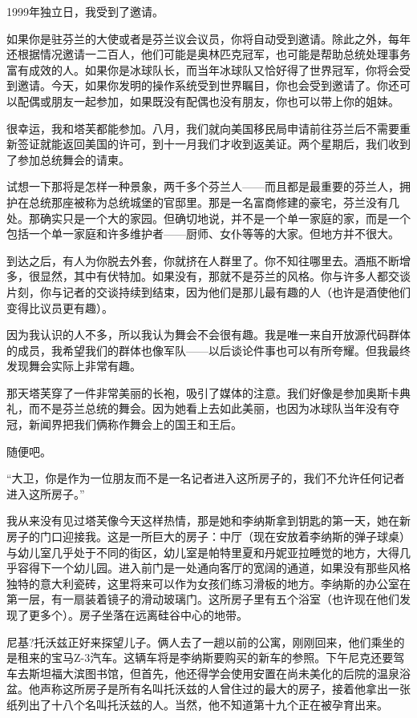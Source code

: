 1999年独立日，我受到了邀请。

如果你是驻芬兰的大使或者是芬兰议会议员，你将自动受到邀请。除此之外，每年还根据情况邀请一二百人，他们可能是奥林匹克冠军，也可能是帮助总统处理事务富有成效的人。如果你是冰球队长，而当年冰球队又恰好得了世界冠军，你将会受到邀请。今天，如果你发明的操作系统受到世界瞩目，你也会受到邀请了。你还可以配偶或朋友一起参加，如果既没有配偶也没有朋友，你也可以带上你的姐妹。

很幸运，我和塔芙都能参加。八月，我们就向美国移民局申请前往芬兰后不需要重新签证就能返回美国的许可，到十一月我们才收到返美证。两个星期后，我们收到了参加总统舞会的请柬。

试想一下那将是怎样一种景象，两千多个芬兰人——而且都是最重要的芬兰人，拥护在总统那座被称为总统城堡的官邸里。那是一名富商修建的豪宅，芬兰没有几处。那确实只是一个大的家园。但确切地说，并不是一个单一家庭的家，而是一个包括一个单一家庭和许多维护者——厨师、女仆等等的大家。但地方并不很大。

到达之后，有人为你脱去外套，你就挤在人群里了。你不知往哪里去。酒瓶不断增多，很显然，其中有伏特加。如果没有，那就不是芬兰的风格。你与许多人都交谈片刻，你与记者的交谈持续到结束，因为他们是那儿最有趣的人（也许是酒使他们变得比议员更有趣）。

因为我认识的人不多，所以我认为舞会不会很有趣。我是唯一来自开放源代码群体的成员，我希望我们的群体也像军队——以后谈论件事也可以有所夸耀。但我最终发现舞会实际上非常有趣。

那天塔芙穿了一件非常美丽的长袍，吸引了媒体的注意。我们好像是参加奥斯卡典礼，而不是芬兰总统的舞会。因为她看上去如此美丽，也因为冰球队当年没有夺冠，新闻界把我们俩称作舞会上的国王和王后。

随便吧。

 

“大卫，你是作为一位朋友而不是一名记者进入这所房子的，我们不允许任何记者进入这所房子。”

我从来没有见过塔芙像今天这样热情，那是她和李纳斯拿到钥匙的第一天，她在新房子的门口迎接我。这是一所巨大的房子：中厅（现在安放着李纳斯的弹子球桌）与幼儿室几乎处于不同的街区，幼儿室是帕特里夏和丹妮亚拉睡觉的地方，大得几乎容得下一个幼儿园。进入前门是一处通向客厅的宽阔的通道，如果没有那些风格独特的意大利瓷砖，这里将来可以作为女孩们练习滑板的地方。李纳斯的办公室在第一层，有一扇装着镜子的滑动玻璃门。这所房子里有五个浴室（也许现在他们发现了更多个）。房子坐落在远离硅谷中心的地带。

尼基?托沃兹正好来探望儿子。俩人去了一趟以前的公寓，刚刚回来，他们乘坐的是租来的宝马Z-3汽车。这辆车将是李纳斯要购买的新车的参照。下午尼克还要驾车去斯坦福大滨图书馆，但首先，他还得学会使用安置在尚未美化的后院的温泉浴盆。他声称这所房子是所有名叫托沃兹的人曾住过的最大的房子，接着他拿出一张纸列出了十八个名叫托沃兹的人。当然，他不知道第十九个正在被孕育出来。

